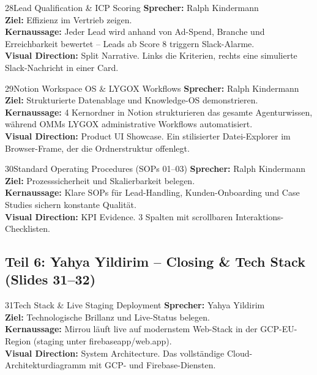 \documentclass[11pt,a4paper]{article}
\begin{document}
\begin{slidebox}{28}{Lead Qualification & ICP Scoring}
    \textbf{Sprecher:} Ralph Kindermann \\
    \textbf{Ziel:} Effizienz im Vertrieb zeigen.\\
    \textbf{Kernaussage:} Jeder Lead wird anhand von Ad-Spend, Branche und Erreichbarkeit bewertet -- Leads ab Score 8 triggern Slack-Alarme.\\
    \textbf{Visual Direction:} Split Narrative. Links die Kriterien, rechts eine simulierte Slack-Nachricht in einer Card.
\end{slidebox}

\begin{slidebox}{29}{Notion Workspace OS \& LYGOX Workflows}
    \textbf{Sprecher:} Ralph Kindermann \\
    \textbf{Ziel:} Strukturierte Datenablage und Knowledge-OS demonstrieren.\\
    \textbf{Kernaussage:} 4 Kernordner in Notion strukturieren das gesamte Agenturwissen, während OMMs LYGOX administrative Workflows automatisiert.\\
    \textbf{Visual Direction:} Product UI Showcase. Ein stilisierter Datei-Explorer im Browser-Frame, der die Ordnerstruktur offenlegt.
\end{slidebox}

\begin{slidebox}{30}{Standard Operating Procedures (SOPs 01--03)}
    \textbf{Sprecher:} Ralph Kindermann \\
    \textbf{Ziel:} Prozesssicherheit und Skalierbarkeit belegen.\\
    \textbf{Kernaussage:} Klare SOPs für Lead-Handling, Kunden-Onboarding und Case Studies sichern konstante Qualität.\\
    \textbf{Visual Direction:} KPI Evidence. 3 Spalten mit scrollbaren Interaktions-Checklisten.
\end{slidebox}

\newpage
\subsection{Teil 6: Yahya Yildirim -- Closing \& Tech Stack (Slides 31--32)}

\begin{slidebox}{31}{Tech Stack \& Live Staging Deployment}
    \textbf{Sprecher:} Yahya Yildirim \\
    \textbf{Ziel:} Technologische Brillanz und Live-Status belegen.\\
    \textbf{Kernaussage:} Mirrou läuft live auf modernstem Web-Stack in der GCP-EU-Region (staging unter firebaseapp/web.app).\\
    \textbf{Visual Direction:} System Architecture. Das vollständige Cloud-Architekturdiagramm mit GCP- und Firebase-Diensten.
\end{slidebox}
\end{document}
